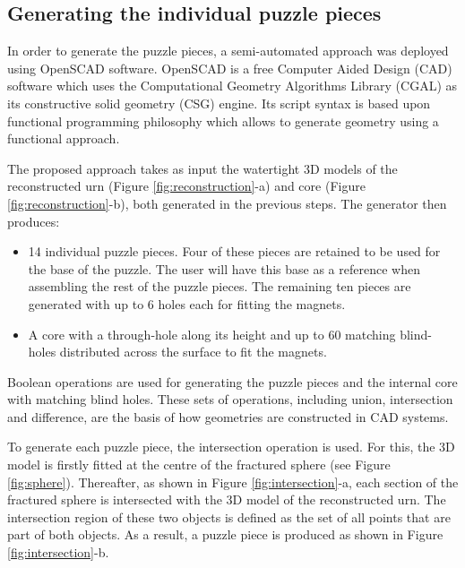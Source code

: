 \documentclass[acmlarge,screen]{acmart}
\begin{document}
\subsection{Generating the individual puzzle pieces}

In order to generate the puzzle pieces, a semi-automated approach was deployed using OpenSCAD software. OpenSCAD is a free Computer Aided Design (CAD) software which uses the Computational Geometry Algorithms Library (CGAL) as its constructive solid geometry (CSG) engine. Its script syntax is based upon functional programming philosophy which allows to generate geometry using a functional approach.

The proposed approach takes as input the watertight 3D models of the reconstructed urn (Figure \ref{fig:reconstruction}-a) and core (Figure \ref{fig:reconstruction}-b), both generated in the previous steps. The generator then produces:
\begin{itemize}
\item 14 individual puzzle pieces. Four of these pieces are retained to be used for the base of the puzzle. The user will have this base as a reference when assembling the rest of the puzzle pieces. The remaining ten pieces are generated with up to 6 holes each for fitting the magnets.
\item A core with a through-hole along its height and up to 60 matching blind-holes distributed across the surface to fit the magnets.
\end{itemize}


Boolean operations are  used for generating the puzzle pieces and the internal core with matching blind holes. These sets of operations, including union, intersection and difference, are the basis of how geometries are constructed in CAD systems.  

To generate each puzzle piece, the intersection operation is used. For this, the 3D model is  firstly fitted at the centre of the fractured sphere (see Figure \ref{fig:sphere}). Thereafter, as shown in Figure \ref{fig:intersection}-a, each section of the fractured sphere is intersected with the 3D model of the reconstructed urn. The intersection region of these two objects is defined as the set of all points that are part of both objects. As a result, a puzzle piece is produced as shown in Figure \ref{fig:intersection}-b.
\end{document}
